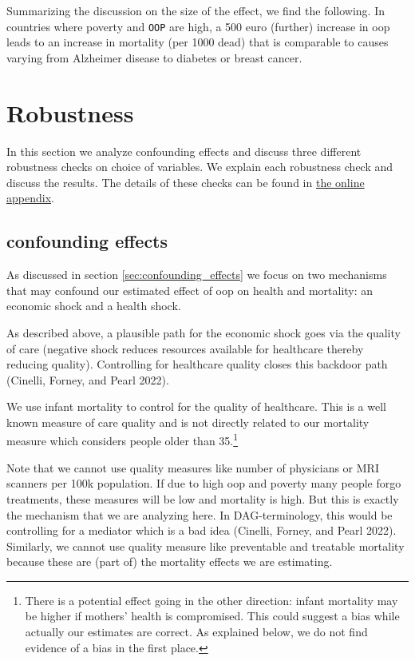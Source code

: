 \documentclass[a4paper,12pt]{article}
\makeatletter
\newcommand{\citeprocitem}[2]{\hyper@linkstart{cite}{citeproc_bib_item_#1}#2\hyper@linkend}
\makeatother
\begin{document}
Summarizing the discussion on the size of the effect, we find the following. In countries where poverty and \texttt{OOP} are high, a 500 euro (further) increase in oop leads to an increase in mortality (per 1000 dead) that is comparable to causes varying from Alzheimer disease to diabetes or breast cancer.



\section{Robustness}
\label{sec:org3236d14}
In this section we analyze confounding effects and discuss three different robustness checks on choice of variables. We explain each robustness check and discuss the results. The details of these checks can be found in \href{https://janboone.github.io/out\_of\_pocket\_payments\_and\_health/index.html}{the online appendix}.

\subsection{confounding effects}
\label{sec:orgcbea0db}

As discussed in section \ref{sec:confounding_effects} we focus on two mechanisms that may confound our estimated effect of oop on health and mortality: an economic shock and a health shock.

As described above, a plausible path for the economic shock goes via the quality of care (negative shock reduces resources available for healthcare thereby reducing quality). Controlling for healthcare quality closes this backdoor path (\citeprocitem{10}{Cinelli, Forney, and Pearl 2022}).

We use infant mortality to control for the quality of healthcare. This is a well known measure of care quality and is not directly related to our mortality measure which considers people older than 35.\footnote{There is a potential effect going in the other direction: infant mortality may be higher if mothers' health is compromised. This could suggest a bias while actually our estimates are correct. As explained below, we do not find evidence of a bias in the first place.} 

Note that we cannot use quality measures like number of physicians or MRI scanners per 100k population. If due to high oop and poverty many people forgo treatments, these measures will be low and mortality is high. But this is exactly the mechanism that we are analyzing here. In DAG-terminology, this would be controlling for a mediator which is a bad idea (\citeprocitem{10}{Cinelli, Forney, and Pearl 2022}). Similarly, we cannot use quality measure like preventable and treatable mortality because these are (part of) the mortality effects we are estimating.
\end{document}
